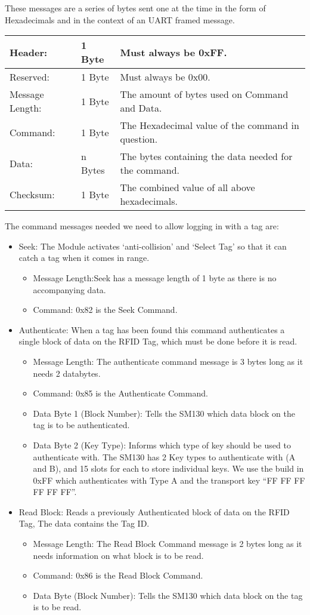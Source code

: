 These messages are a series of bytes sent one at the time in the form of Hexadecimals and in the context of an UART framed message. \newline
\begin{tabular}{|l|l|l|}
\hline \hline
Header: & 1 Byte & Must always be 0xFF.\\ \hline
Reserved: & 1 Byte & Must always be 0x00.\\ \hline
Message Length: & 1 Byte & The amount of bytes used on Command and Data.\\ \hline
Command: & 1 Byte & The Hexadecimal value of the command in question.\\ \hline
Data: & n Bytes & The bytes containing the data needed for the command.\\ \hline
Checksum: & 1 Byte & The combined value of all above hexadecimals.\\ \hline
\end{tabular}
The command messages needed we need to allow logging in with a tag are: 
\begin{itemize}
	\item Seek: The Module activates `anti-collision' and `Select Tag' so that it can catch a tag when it comes in range.
	\begin{itemize}
		\item Message Length:Seek has a message length of 1 byte as there is no accompanying data.
		\item Command: 0x82 is the Seek Command.
	\end{itemize}
	\item Authenticate: When a tag has been found this command authenticates a single block of data on the RFID Tag, which must be done before it is read.
	\begin{itemize}
		\item Message Length: The authenticate command message is 3 bytes long as it needs 2 databytes.
		\item Command: 0x85 is the Authenticate Command.
		\item Data Byte 1 (Block Number): Tells the SM130 which data block on the tag is to be authenticated.
		\item Data Byte 2 (Key Type): Informs which type of key should be used to authenticate with. The SM130 has 2 Key types to authenticate with (A and B), and 15 slots for each to store individual keys. We use the build in 0xFF which authenticates with Type A and the transport key ``FF FF FF FF FF FF''.
	\end{itemize}
	\item Read Block: Reads a previously Authenticated block of data on the RFID Tag, The data contains the Tag ID.
	\begin{itemize}
		\item Message Length: The Read Block Command message is 2 bytes long as it needs information on what block is to be read.
		\item Command: 0x86 is the Read Block Command.
		\item Data Byte (Block Number): Tells the SM130 which data block on the tag is to be read.
	\end{itemize}
\end{itemize}

